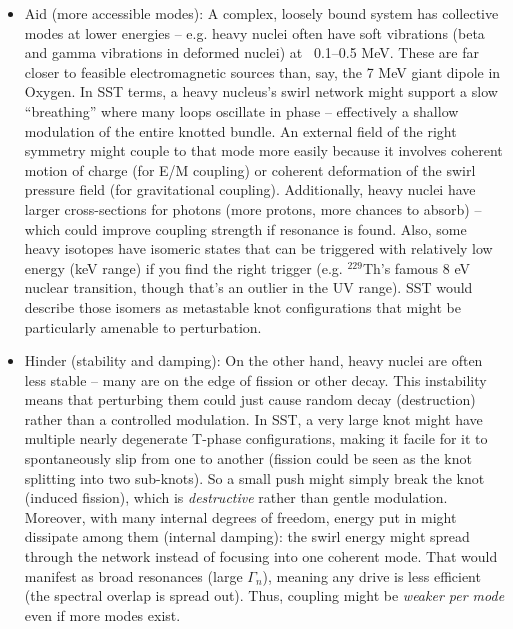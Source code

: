\documentclass[11pt]{article}
\begin{document}
\begin{itemize}

\item 
Aid (more accessible modes): A complex, loosely bound system has collective modes at lower energies – e.g. heavy nuclei often have soft vibrations (beta and gamma vibrations in deformed nuclei) at ~0.1–0.5 MeV. These are far closer to feasible electromagnetic sources than, say, the 7 MeV giant dipole in Oxygen. In SST terms, a heavy nucleus’s swirl network might support a slow “breathing” where many loops oscillate in phase – effectively a shallow modulation of the entire knotted bundle. An external field of the right symmetry might couple to that mode more easily because it involves coherent motion of charge (for E/M coupling) or coherent deformation of the swirl pressure field (for gravitational coupling). Additionally, heavy nuclei have larger cross-sections for photons (more protons, more chances to absorb) – which could improve coupling strength if resonance is found. Also, some heavy isotopes have isomeric states that can be triggered with relatively low energy (keV range) if you find the right trigger (e.g. $^{229}$Th’s famous 8 eV nuclear transition, though that’s an outlier in the UV range). SST would describe those isomers as metastable knot configurations that might be particularly amenable to perturbation.




\item 
Hinder (stability and damping): On the other hand, heavy nuclei are often less stable – many are on the edge of fission or other decay. This instability means that perturbing them could just cause random decay (destruction) rather than a controlled modulation. In SST, a very large knot might have multiple nearly degenerate T-phase configurations, making it facile for it to spontaneously slip from one to another (fission could be seen as the knot splitting into two sub-knots). So a small push might simply break the knot (induced fission), which is \textit{destructive} rather than gentle modulation. Moreover, with many internal degrees of freedom, energy put in might dissipate among them (internal damping): the swirl energy might spread through the network instead of focusing into one coherent mode. That would manifest as broad resonances (large $\Gamma_n$), meaning any drive is less efficient (the spectral overlap is spread out). Thus, coupling might be \textit{weaker per mode} even if more modes exist.




\end{itemize}
\end{document}
